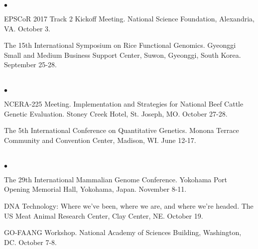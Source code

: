 \documentclass[margin,line,10pt]{res}
\newenvironment{list2}{
  \begin{list}{$\bullet$}{%
      \setlength{\itemsep}{0in}
      \setlength{\parsep}{0in} \setlength{\parskip}{0in}
      \setlength{\topsep}{0in} \setlength{\partopsep}{0in} 
      \setlength{\leftmargin}{0.2in}}}{\end{list}}
\begin{document}
\begin{resume}
\begin{list2}
\item EPSCoR 2017 Track 2 Kickoff Meeting.  National Science Foundation, Alexandria, VA. October 3.
  
  \vspace{0.5cm}

\item The 15th International Symposium on Rice Functional Genomics. Gyeonggi Small and Medium Business Support Center, Suwon, Gyeonggi, South Korea. September 25-28.

  
  \end{list2}  


\section{}
\begin{list2}

\item NCERA-225 Meeting. Implementation and Strategies for National Beef Cattle Genetic Evaluation. Stoney Creek Hotel, St. Joseph, MO. October 27-28. 

  \vspace{0.5cm}
  
\item The 5th International Conference on Quantitative Genetics. Monona Terrace Community and Convention Center, Madison, WI. June 12-17. 

\end{list2}  




\section{}
\begin{list2}
  
\item The 29th International Mammalian Genome Conference. Yokohama Port Opening Memorial Hall, Yokohama, Japan. November 8-11. 

  \vspace{0.5cm}
  
  \item DNA Technology: Where we've been, where we are, and where we're headed. The US Meat Animal Research Center, Clay Center, NE. October 19. 
  
  \vspace{0.5cm}
  
\item GO-FAANG Workshop. National Academy of Sciences Building, Washington, DC. October 7-8. 
\end{list2}  


\end{resume}
\end{document}
